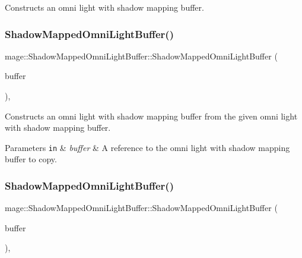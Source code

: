 Constructs an omni light with shadow mapping buffer. \hypertarget{structmage_1_1_shadow_mapped_omni_light_buffer_a179cdb73fe29141d129da3e7f26ddd4e}{}\label{structmage_1_1_shadow_mapped_omni_light_buffer_a179cdb73fe29141d129da3e7f26ddd4e} 
\subsubsection{\texorpdfstring{Shadow\+Mapped\+Omni\+Light\+Buffer()}{ShadowMappedOmniLightBuffer()}\hspace{0.1cm}{\footnotesize\ttfamily [2/3]}}
{\footnotesize\ttfamily mage\+::\+Shadow\+Mapped\+Omni\+Light\+Buffer\+::\+Shadow\+Mapped\+Omni\+Light\+Buffer (\begin{DoxyParamCaption}\item[{const \hyperlink{structmage_1_1_shadow_mapped_omni_light_buffer}{Shadow\+Mapped\+Omni\+Light\+Buffer} \&}]{buffer }\end{DoxyParamCaption})\hspace{0.3cm}{\ttfamily [default]}, {\ttfamily [noexcept]}}

Constructs an omni light with shadow mapping buffer from the given omni light with shadow mapping buffer.


\begin{DoxyParams}[1]{Parameters}
\mbox{\tt in}  & {\em buffer} & A reference to the omni light with shadow mapping buffer to copy. \\
\hline
\end{DoxyParams}
\hypertarget{structmage_1_1_shadow_mapped_omni_light_buffer_abf606d09675b88abe17a61d83c70b04b}{}\label{structmage_1_1_shadow_mapped_omni_light_buffer_abf606d09675b88abe17a61d83c70b04b} 
\subsubsection{\texorpdfstring{Shadow\+Mapped\+Omni\+Light\+Buffer()}{ShadowMappedOmniLightBuffer()}\hspace{0.1cm}{\footnotesize\ttfamily [3/3]}}
{\footnotesize\ttfamily mage\+::\+Shadow\+Mapped\+Omni\+Light\+Buffer\+::\+Shadow\+Mapped\+Omni\+Light\+Buffer (\begin{DoxyParamCaption}\item[{\hyperlink{structmage_1_1_shadow_mapped_omni_light_buffer}{Shadow\+Mapped\+Omni\+Light\+Buffer} \&\&}]{buffer }\end{DoxyParamCaption})\hspace{0.3cm}{\ttfamily [default]}, {\ttfamily [noexcept]}}

